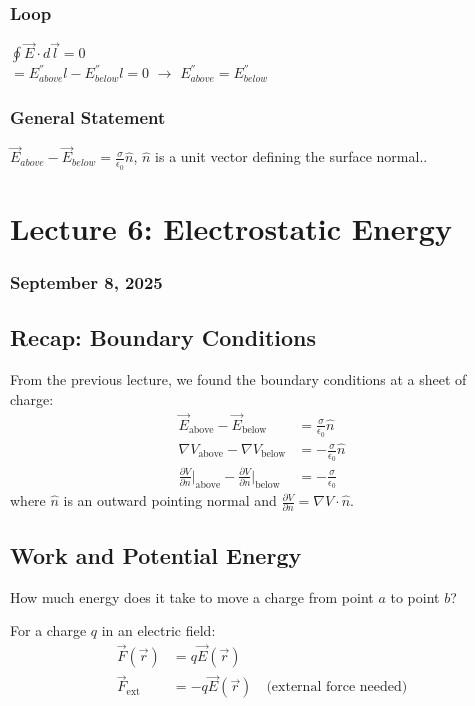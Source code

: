 \documentclass{article}
\begin{document}
\subsubsection{Loop}
$\oint \vec{E} \cdot d\vec{l} = 0$ \\
$=E^{''}_{above}l-E^{''}_{below}l=0$ $\rightarrow$ $E^{''}_{above}=E^{''}_{below}$
\subsubsection{General Statement}
$\vec{E}_{above}-\vec{E}_{below}=\frac{\sigma}{\epsilon_0}\hat{n}$, $\hat{n}$ is a unit vector defining the surface normal..

\newpage
\section{Lecture 6: Electrostatic Energy}
\subsubsection*{September 8, 2025}

\subsection{Recap: Boundary Conditions}
From the previous lecture, we found the boundary conditions at a sheet of charge:
\begin{align}
    \vec{E}_{\text{above}} - \vec{E}_{\text{below}} &= \frac{\sigma}{\epsilon_0}\hat{n} \\
    \nabla V_{\text{above}} - \nabla V_{\text{below}} &= -\frac{\sigma}{\epsilon_0}\hat{n} \\
    \frac{\partial V}{\partial n}\bigg|_{\text{above}} - \frac{\partial V}{\partial n}\bigg|_{\text{below}} &= -\frac{\sigma}{\epsilon_0}
\end{align}
where $\hat{n}$ is an outward pointing normal and $\frac{\partial V}{\partial n} = \nabla V \cdot \hat{n}$.

\subsection{Work and Potential Energy}
How much energy does it take to move a charge from point $a$ to point $b$?

For a charge $q$ in an electric field:
\begin{align}
    \vec{F}(\vec{r}) &= q\vec{E}(\vec{r}) \\
    \vec{F}_{\text{ext}} &= -q\vec{E}(\vec{r}) \quad \text{(external force needed)}
\end{align}
\end{document}
